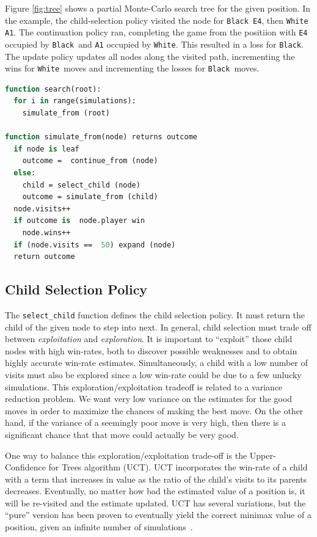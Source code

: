 \documentclass{acm_proc_article-sp}
\newcommand{\hblack}{\texttt{Black}}
\newcommand{\hwhite}{\texttt{White}}
\begin{document}
Figure \ref{fig:tree} shows a partial Monte-Carlo search tree for the given position. In the example, the child-selection policy visited the node for \texttt{Black E4}, then \texttt{White A1}. 
The continuation policy ran, completing the game from the positiion with \texttt{E4} occupied by \hblack\ and \texttt{A1} occupied by \hwhite.
This resulted in a loss for \hblack. 
The update policy updates all nodes along the visited path, incrementing the wins for \hwhite\ moves and incrementing the losses for \hblack\ moves.

\begin{lstlisting}[float,frame=single,language=Pascal,caption=MCTS Algorithm Pseudocode]
function search(root):
  for i in range(simulations):
    simulate_from (root)

function simulate_from(node) returns outcome
  if node is leaf
    outcome =  continue_from (node)
  else:
    child = select_child (node)
    outcome = simulate_from (child)
  node.visits++
  if outcome is  node.player win
    node.wins++
  if (node.visits ==  50) expand (node)
  return outcome
\end{lstlisting}

\subsection{Child Selection Policy}
The \verb+select_child+ function defines the child selection policy. It must return the child of the given node to step into next. 
In general, child selection must trade off between \emph{exploitation} and \emph{exploration}. 
It is important to ``exploit'' those child nodes with high win-rates, both
to discover possible weaknesses and to obtain highly accurate win-rate estimates. 
Simultaneously, a child with a low number of visits must also be explored since a low win-rate
could be due to a few unlucky simulations.
This exploration/exploitation tradeoff is related to a variance reduction problem.  
We want very low variance on the estimates for the good moves in order to maximize the chances of making the best move.
On the other hand, if the variance of a seemingly poor move is very high, then there is a significant chance that that move could actually be very good.

One way to balance this exploration/exploitation trade-off is the Upper-Confidence for Trees algorithm (UCT). 
UCT incorporates the win-rate of a child with a term that increases in value as the ratio of the child's visits to its parents decreases. 
Eventually, no matter how bad the estimated value of a position is, it will be re-visited and the estimate updated. 
UCT has several variations, but the ``pure'' version has been proven to eventually yield the correct minimax value of a position, given an infinite number of simulations~\cite{gelly2006exploration}.
\end{document}
